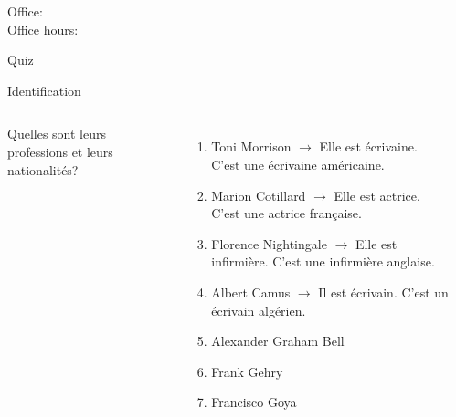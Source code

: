 \documentclass{beamer}
\subtitle[Métier et \lexi{c'est} et \lexi{il est}]{Les métiers et \lexi{c'est} contre \lexi{il est}}
\begin{document}
  \begin{frame}
    \titlepage
    \tiny{Office: \\
          Office hours: }
  \end{frame}

  \begin{frame}{}
    \begin{center}
      \Large Quiz
    \end{center}
  \end{frame}

  \begin{frame}{Identification}
    \begin{columns}
        {\scriptsize
        Quelles sont leurs professions et leurs nationalités?
        \begin{enumerate}
          \item Toni Morrison
           {$\to$ Elle est écrivaine. C'est une écrivaine américaine.}
          \item<3-> Marion Cotillard
           {$\to$ Elle est actrice. C'est une actrice française.}
          \item<5-> Florence Nightingale
           {$\to$ Elle est infirmière. C'est une infirmière anglaise.}
          \item<7-> Albert Camus
           {$\to$ Il est écrivain. C'est un écrivain algérien.}
          \item<9-> Alexander Graham Bell
          \item<11-> Frank Gehry
          \item<13-> Francisco Goya
        \end{enumerate}
        }
        \begin{minipage}[c][0.6\textheight]{\linewidth}
          \begin{center}
\end{center}
\end{minipage}
\end{columns}
\end{frame}
\end{document}
